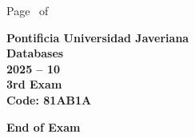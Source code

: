 \documentclass[11pt, addpoints]{exam}\usepackage[utf8]{inputenc}
\begin{document}
\begin{coverpages}
\begin{center}
			\vspace{3mm}
			\leavevmode \hspace{5mm} 
		\end{center}
	\end{coverpages}

	\footer{} {Page \thepage\ of \numpages} {}

	\centering
	\textbf{\Large Pontificia Universidad Javeriana}\\
	\textbf{\Large Databases} \\
	\textbf{\large 2025 -- 10} \\
	\textbf{\large 3rd Exam} \\
	\textbf{Code: 81AB1A}


	\begin{questions}
		
		
		
		
		
		
		
		
		
		
		
		
		
		
		
		
		
		
		
		
	\end{questions}

	\vspace{5mm}
	\noindent \textbf{End of Exam}
\end{document}
